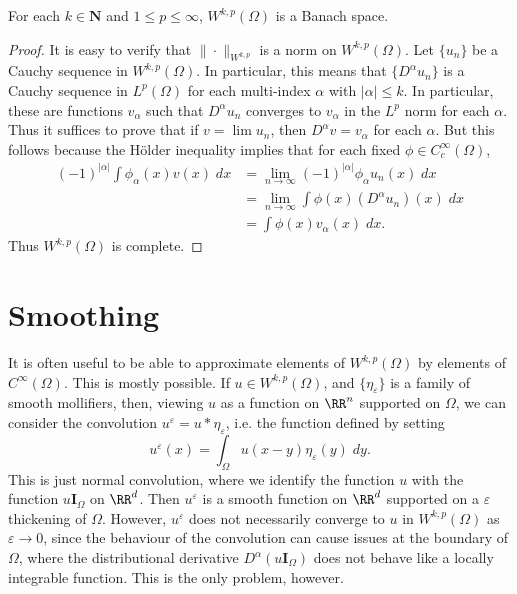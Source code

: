 \begin{theorem}
  For each $k \in \mathbf{N}$ and $1 \leq p \leq \infty$, $W^{k,p}(\Omega)$ is a Banach space.
\end{theorem}
\begin{proof}
  It is easy to verify that $\| \cdot \|_{W^{k,p}}$ is a norm on $W^{k,p}(\Omega)$. Let $\{ u_n \}$ be a Cauchy sequence in $W^{k,p}(\Omega)$. In particular, this means that $\{ D^\alpha u_n \}$ is a Cauchy sequence in $L^p(\Omega)$ for each multi-index $\alpha$ with $|\alpha| \leq k$. In particular, these are functions $v_\alpha$ such that $D^\alpha u_n$ converges to $v_\alpha$ in the $L^p$ norm for each $\alpha$. Thus it suffices to prove that if $v = \lim u_n$, then $D^\alpha v = v_\alpha$ for each $\alpha$. But this follows because the H\"{o}lder inequality implies that for each fixed $\phi \in C_c^\infty(\Omega)$,
  \begin{align*}
    (-1)^{|\alpha|} \int \phi_\alpha(x) v(x)\; dx &= \lim_{n \to \infty} (-1)^{|\alpha|} \phi_\alpha u_n(x)\; dx\\
    &= \lim_{n \to \infty} \int \phi(x) (D^\alpha u_n)(x)\; dx\\
    &= \int \phi(x) v_\alpha(x)\; dx.
  \end{align*}
  Thus $W^{k,p}(\Omega)$ is complete.
\end{proof}

\section{Smoothing}

It is often useful to be able to approximate elements of $W^{k,p}(\Omega)$ by elements of $C^\infty(\Omega)$. This is mostly possible. If $u \in W^{k,p}(\Omega)$, and $\{ \eta_\varepsilon \}$ is a family of smooth mollifiers, then, viewing $u$ as a function on $\RR^n$ supported on $\Omega$, we can consider the convolution $u^\varepsilon = u * \eta_\varepsilon$, i.e. the function defined by setting
%
\[ u^\varepsilon(x) = \int_\Omega u(x - y) \eta_\varepsilon(y)\; dy. \]
%
This is just normal convolution, where we identify the function $u$ with the function $u \mathbf{I}_\Omega$ on $\RR^d$. Then $u^\varepsilon$ is a smooth function on $\RR^d$ supported on a $\varepsilon$ thickening of $\Omega$. However, $u^\varepsilon$ does not necessarily converge to $u$ in $W^{k,p}(\Omega)$ as $\varepsilon \to 0$, since the behaviour of the convolution can cause issues at the boundary of $\Omega$, where the distributional derivative $D^\alpha(u \mathbf{I}_\Omega)$ does not behave like a locally integrable function. This is the only problem, however.

